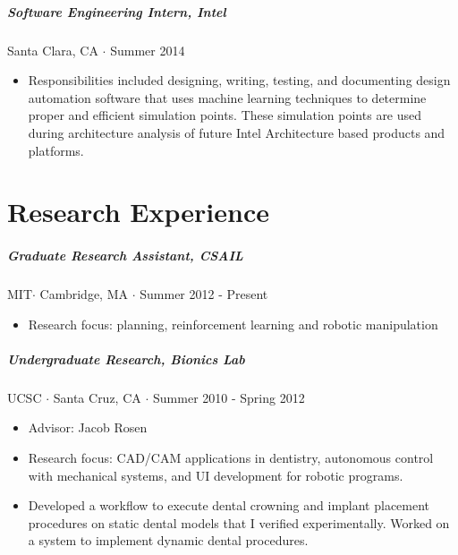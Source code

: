 \documentclass[10pt,letterpaper]{article}
\begin{document}
\subparagraph{Software Engineering Intern, Intel}
Santa Clara, CA $\cdot$ Summer 2014
\begin{itemize}
\item Responsibilities included designing, writing, testing, and documenting design automation software that uses machine learning techniques to determine proper and efficient simulation points. These simulation points are used during architecture analysis of future Intel Architecture based products and platforms.
\end{itemize}


\section*{Research Experience}
\subparagraph{Graduate Research Assistant, CSAIL}
MIT$\cdot$ Cambridge, MA $\cdot$ Summer 2012 - Present
\begin{itemize}
	\item Research focus: planning, reinforcement learning and robotic manipulation
 \end{itemize}
 \subparagraph{Undergraduate Research, Bionics Lab}
UCSC $\cdot$ Santa Cruz, CA $\cdot$ Summer 2010 - Spring 2012
\begin{itemize}
	\item Advisor: Jacob Rosen 
     	\item Research focus: CAD/CAM applications in dentistry, autonomous control with mechanical systems, and UI development for robotic programs.
     	\item  Developed a workflow to execute dental crowning and implant placement procedures on static dental models that I verified experimentally. Worked on a system to implement dynamic dental procedures. 
\end{itemize}
\end{document}

